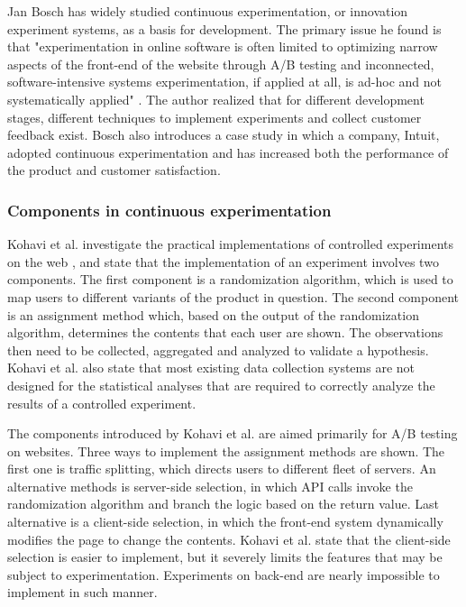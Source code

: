 \documentclass[english]{tktltiki2}
\theoremstyle{definition}
\theoremstyle{remark}
\begin{document}
Jan Bosch has widely studied continuous experimentation, or innovation experiment systems, as a basis for development. The primary issue he found is that "experimentation in online software is often limited to optimizing narrow aspects of the front-end of the website through A/B testing and inconnected, software-intensive systems experimentation, if applied at all, is ad-hoc and not systematically applied" \cite{bosch2012building}. The author realized that for different development stages, different techniques to implement experiments and collect customer feedback exist. Bosch also introduces a case study in which a company, Intuit, adopted continuous experimentation and has increased both the performance of the product and customer satisfaction.

\subsubsection{Components in continuous experimentation}
Kohavi et al. investigate the practical implementations of controlled experiments on the web \cite{kohavi2007practical}, and state that the implementation of an experiment involves two components. The first component is a randomization algorithm, which is used to map users to different variants of the product in question. The second component is an assignment method which, based on the output of the randomization algorithm, determines the contents that each user are shown. The observations then need to be collected, aggregated and analyzed to validate a hypothesis. Kohavi et al. also state that most existing data collection systems are not designed for the statistical analyses that are required to correctly analyze the results of a controlled experiment.

The components introduced by Kohavi et al. are aimed primarily for A/B testing on websites. Three ways to implement the assignment methods are shown. The first one is traffic splitting, which directs users to different fleet of servers. An alternative methods is server-side selection, in which API calls invoke the randomization algorithm and branch the logic based on the return value. Last alternative is a client-side selection, in which the front-end system dynamically modifies the page to change the contents. Kohavi et al. state that the client-side selection is easier to implement, but it severely limits the features that may be subject to experimentation. Experiments on back-end are nearly impossible to implement in such manner.
\end{document}
